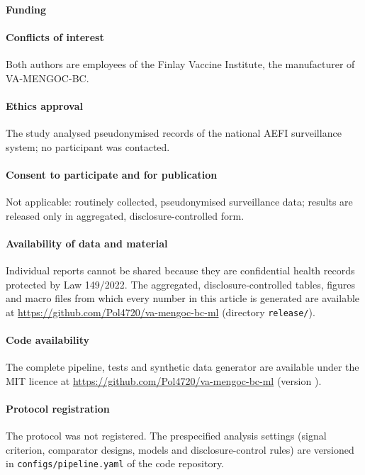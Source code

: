 \small
\paragraph{Funding} 

\paragraph{Conflicts of interest} Both authors are employees of the Finlay Vaccine Institute, the
manufacturer of VA-MENGOC-BC. 

\paragraph{Ethics approval} The study analysed pseudonymised records of the national AEFI
surveillance system; no participant was contacted. 

\paragraph{Consent to participate and for publication} Not applicable: routinely collected,
pseudonymised surveillance data; results are released only in aggregated, disclosure-controlled
form.

\paragraph{Availability of data and material} Individual reports cannot be shared because they are
confidential health records protected by Law 149/2022. The aggregated, disclosure-controlled
tables, figures and macro files from which every number in this article is generated are available
at \url{https://github.com/Pol4720/va-mengoc-bc-ml} (directory \texttt{release/}).

\paragraph{Code availability} The complete pipeline, tests and synthetic data generator are
available under the MIT licence at \url{https://github.com/Pol4720/va-mengoc-bc-ml}
(version \VCodeVersion).

\paragraph{Protocol registration} The protocol was not registered. The prespecified analysis
settings (signal criterion, comparator designs, models and disclosure-control rules) are versioned in
\texttt{configs/pipeline.yaml} of the code repository.


